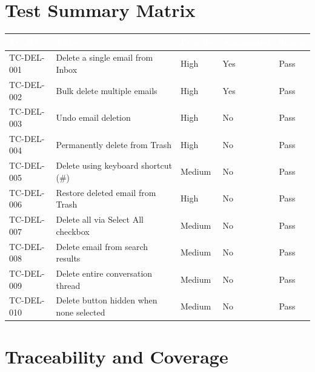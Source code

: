 \documentclass[12pt,a4paper]{article}
\begin{document}
\newpage

\section{Test Summary Matrix}

\begin{longtable}{|C{2cm}|L{7cm}|C{1.5cm}|C{2cm}|C{2cm}|}
\hline
{}
\textcolor{white}{\textbf{TC-ID}} & \textcolor{white}{\textbf{Title}} & \textcolor{white}{\textbf{Priority}} & \textcolor{white}{\textbf{Automated}} & \textcolor{white}{\textbf{Status}} \\
\hline
TC-DEL-001 & Delete a single email from Inbox          & High   & Yes & Pass \\ \hline
TC-DEL-002 & Bulk delete multiple emails               & High   & Yes & Pass \\ \hline
TC-DEL-003 & Undo email deletion                       & High   & No  & Pass \\ \hline
TC-DEL-004 & Permanently delete from Trash             & High   & No  & Pass \\ \hline
TC-DEL-005 & Delete using keyboard shortcut (\#)       & Medium & No  & Pass \\ \hline
TC-DEL-006 & Restore deleted email from Trash          & High   & No  & Pass \\ \hline
TC-DEL-007 & Delete all via Select All checkbox        & Medium & No  & Pass \\ \hline
TC-DEL-008 & Delete email from search results          & Medium & No  & Pass \\ \hline
TC-DEL-009 & Delete entire conversation thread         & Medium & No  & Pass \\ \hline
TC-DEL-010 & Delete button hidden when none selected   & Medium & No  & Pass \\ \hline
\end{longtable}

\newpage

\section{Traceability and Coverage}
\end{document}
